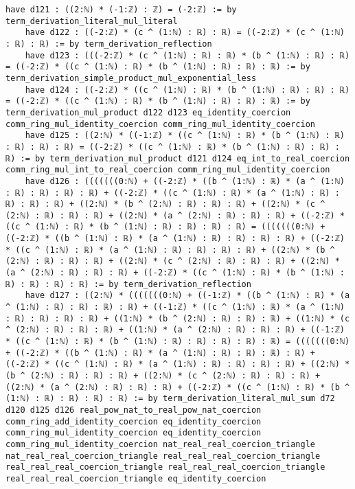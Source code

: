 \documentclass{article}
\begin{document}
\begin{tcolorbox}[colback=white!10, width=\linewidth]
\begin{lstlisting}[language=Lean4]
    have d121 : ((2:ℕ) * (-1:ℤ) : ℤ) = (-2:ℤ) := by term_derivation_literal_mul_literal
    have d122 : ((-2:ℤ) * (c ^ (1:ℕ) : ℝ) : ℝ) = ((-2:ℤ) * (c ^ (1:ℕ) : ℝ) : ℝ) := by term_derivation_reflection
    have d123 : (((-2:ℤ) * (c ^ (1:ℕ) : ℝ) : ℝ) * (b ^ (1:ℕ) : ℝ) : ℝ) = ((-2:ℤ) * ((c ^ (1:ℕ) : ℝ) * (b ^ (1:ℕ) : ℝ) : ℝ) : ℝ) := by term_derivation_simple_product_mul_exponential_less
    have d124 : ((-2:ℤ) * ((c ^ (1:ℕ) : ℝ) * (b ^ (1:ℕ) : ℝ) : ℝ) : ℝ) = ((-2:ℤ) * ((c ^ (1:ℕ) : ℝ) * (b ^ (1:ℕ) : ℝ) : ℝ) : ℝ) := by term_derivation_mul_product d122 d123 eq_identity_coercion comm_ring_mul_identity_coercion comm_ring_mul_identity_coercion
    have d125 : ((2:ℕ) * ((-1:ℤ) * ((c ^ (1:ℕ) : ℝ) * (b ^ (1:ℕ) : ℝ) : ℝ) : ℝ) : ℝ) = ((-2:ℤ) * ((c ^ (1:ℕ) : ℝ) * (b ^ (1:ℕ) : ℝ) : ℝ) : ℝ) := by term_derivation_mul_product d121 d124 eq_int_to_real_coercion comm_ring_mul_int_to_real_coercion comm_ring_mul_identity_coercion
    have d126 : (((((((0:ℕ) + ((-2:ℤ) * ((b ^ (1:ℕ) : ℝ) * (a ^ (1:ℕ) : ℝ) : ℝ) : ℝ) : ℝ) + ((-2:ℤ) * ((c ^ (1:ℕ) : ℝ) * (a ^ (1:ℕ) : ℝ) : ℝ) : ℝ) : ℝ) + ((2:ℕ) * (b ^ (2:ℕ) : ℝ) : ℝ) : ℝ) + ((2:ℕ) * (c ^ (2:ℕ) : ℝ) : ℝ) : ℝ) + ((2:ℕ) * (a ^ (2:ℕ) : ℝ) : ℝ) : ℝ) + ((-2:ℤ) * ((c ^ (1:ℕ) : ℝ) * (b ^ (1:ℕ) : ℝ) : ℝ) : ℝ) : ℝ) = (((((((0:ℕ) + ((-2:ℤ) * ((b ^ (1:ℕ) : ℝ) * (a ^ (1:ℕ) : ℝ) : ℝ) : ℝ) : ℝ) + ((-2:ℤ) * ((c ^ (1:ℕ) : ℝ) * (a ^ (1:ℕ) : ℝ) : ℝ) : ℝ) : ℝ) + ((2:ℕ) * (b ^ (2:ℕ) : ℝ) : ℝ) : ℝ) + ((2:ℕ) * (c ^ (2:ℕ) : ℝ) : ℝ) : ℝ) + ((2:ℕ) * (a ^ (2:ℕ) : ℝ) : ℝ) : ℝ) + ((-2:ℤ) * ((c ^ (1:ℕ) : ℝ) * (b ^ (1:ℕ) : ℝ) : ℝ) : ℝ) : ℝ) := by term_derivation_reflection
    have d127 : ((2:ℕ) * (((((((0:ℕ) + ((-1:ℤ) * ((b ^ (1:ℕ) : ℝ) * (a ^ (1:ℕ) : ℝ) : ℝ) : ℝ) : ℝ) + ((-1:ℤ) * ((c ^ (1:ℕ) : ℝ) * (a ^ (1:ℕ) : ℝ) : ℝ) : ℝ) : ℝ) + ((1:ℕ) * (b ^ (2:ℕ) : ℝ) : ℝ) : ℝ) + ((1:ℕ) * (c ^ (2:ℕ) : ℝ) : ℝ) : ℝ) + ((1:ℕ) * (a ^ (2:ℕ) : ℝ) : ℝ) : ℝ) + ((-1:ℤ) * ((c ^ (1:ℕ) : ℝ) * (b ^ (1:ℕ) : ℝ) : ℝ) : ℝ) : ℝ) : ℝ) = (((((((0:ℕ) + ((-2:ℤ) * ((b ^ (1:ℕ) : ℝ) * (a ^ (1:ℕ) : ℝ) : ℝ) : ℝ) : ℝ) + ((-2:ℤ) * ((c ^ (1:ℕ) : ℝ) * (a ^ (1:ℕ) : ℝ) : ℝ) : ℝ) : ℝ) + ((2:ℕ) * (b ^ (2:ℕ) : ℝ) : ℝ) : ℝ) + ((2:ℕ) * (c ^ (2:ℕ) : ℝ) : ℝ) : ℝ) + ((2:ℕ) * (a ^ (2:ℕ) : ℝ) : ℝ) : ℝ) + ((-2:ℤ) * ((c ^ (1:ℕ) : ℝ) * (b ^ (1:ℕ) : ℝ) : ℝ) : ℝ) : ℝ) := by term_derivation_literal_mul_sum d72 d120 d125 d126 real_pow_nat_to_real_pow_nat_coercion comm_ring_add_identity_coercion eq_identity_coercion comm_ring_mul_identity_coercion eq_identity_coercion comm_ring_mul_identity_coercion nat_real_real_coercion_triangle nat_real_real_coercion_triangle real_real_real_coercion_triangle real_real_real_coercion_triangle real_real_real_coercion_triangle real_real_real_coercion_triangle eq_identity_coercion

\end{lstlisting}
\end{tcolorbox}
\end{document}
